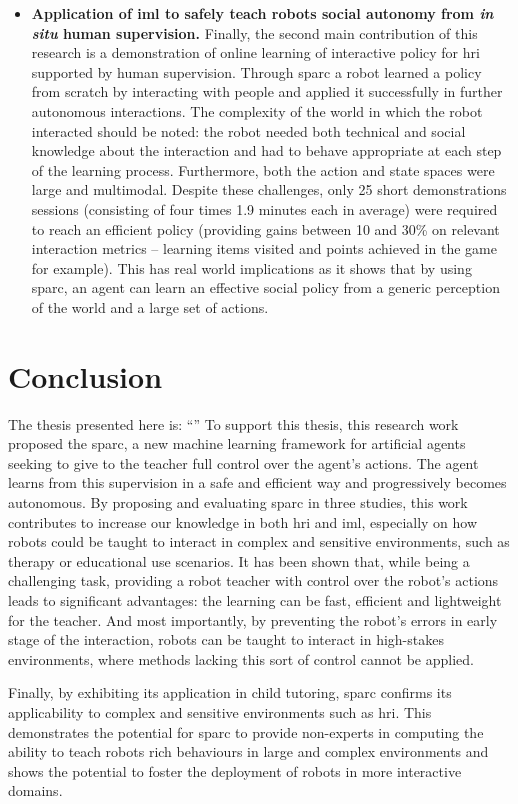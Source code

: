 \begin{itemize}
	\item \textbf{Application of \gls{iml} to safely teach robots social autonomy from \textit{in situ} human supervision.} Finally, the second main contribution of this research is a demonstration of online learning of interactive policy for \gls{hri} supported by human supervision. Through \gls{sparc} a robot learned a policy from scratch by interacting with people and applied it successfully in further autonomous interactions. The complexity of the world in which the robot interacted should be noted: the robot needed both technical and social knowledge about the interaction and had to behave appropriate at each step of the learning process. Furthermore, both the action and state spaces were large and multimodal. Despite these challenges, only 25 short demonstrations sessions (consisting of four times 1.9 minutes each in average) were required to reach an efficient policy (providing gains between 10 and 30\% on relevant interaction metrics -- learning items visited and points achieved in the game for example). This has real world implications as it shows that by using \gls{sparc}, an agent can learn an effective social policy from a generic perception of the world and a large set of actions. 
	
\end{itemize}

\section{Conclusion}\label{sec:conc_conc}

The thesis presented here is: ``\thesis''
To support this thesis, this research work proposed the \acrfull{sparc}, a new machine learning framework for artificial agents seeking to give to the teacher full control over the agent's actions. The agent learns from this supervision in a safe and efficient way and progressively becomes autonomous. By proposing and evaluating \gls{sparc} in three studies, this work contributes to increase our knowledge in both \gls{hri} and \gls{iml}, especially on how robots could be taught to interact in complex and sensitive environments, such as therapy or educational use scenarios. It has been shown that, while being a challenging task, providing a robot teacher with control over the robot's actions leads to significant advantages: the learning can be fast, efficient and lightweight for the teacher. And most importantly, by preventing the robot's errors in early stage of the interaction, robots can be taught to interact in high-stakes environments, where methods lacking this sort of control cannot be applied.

Finally, by exhibiting its application in child tutoring, \gls{sparc} confirms its applicability to complex and sensitive environments such as \gls{hri}. This demonstrates the potential for \gls{sparc} to provide non-experts in computing the ability to teach robots rich behaviours in large and complex environments and shows the potential to foster the deployment of robots in more interactive domains.